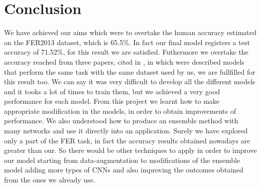 \documentclass[10pt,twocolumn,letterpaper]{article}
\begin{document}


\section{Conclusion}
We have achieved our aims which were to overtake the human accuracy estimated on the FER2013 dataset, which is 65.5\%. In fact our final model registers a test accuracy of 71.52\%, for this result we are satisfied.
Futhermore we overtake the accuracy reached from three papers, cited in \cite{paper}, in which were described models that perform the same task with the same dataset used by us, we are fullfilled for this result too. 
We can say it was very difficult to develop all the different models and it tooks a lot of times to train them, but we achieved a very good performance for each model. 
From this project we learnt how to make appropriate modification in the models, in order to obtain improvements of performance. We also understood how to produce an ensemble method with many networks and use it directly into an application. Surely we have explored only a part of the FER task, in fact the accuracy results obtained nowadays are greater than our. So there would be other techniques to apply in order to improve our model starting from data-augmentation to modifications of the ensemble model adding more types of CNNs and also improving the outcomes obtained from the ones we already use.
\newpage
{\small
   
   
}
\end{document}
